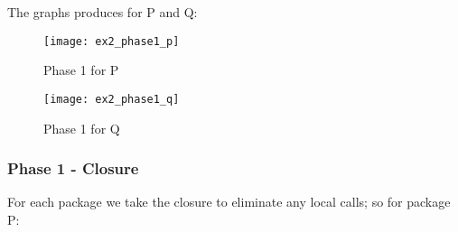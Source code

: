\documentclass{article}
\begin{document}
\noindent
The graphs produces for P and Q:

\begin{figure}[h]
  \begin{center}
    \texttt{[image: ex2\_phase1\_p]}
  \end{center}
  \caption{Phase 1 for P}
\end{figure}

\begin{figure}[h]
  \begin{center}
    \texttt{[image: ex2\_phase1\_q]}
  \end{center}
  \caption{Phase 1 for Q}
\end{figure}

\subsubsection{Phase 1 - Closure}
For each package we take the closure to eliminate any local calls; so for
package P:
\end{document}

